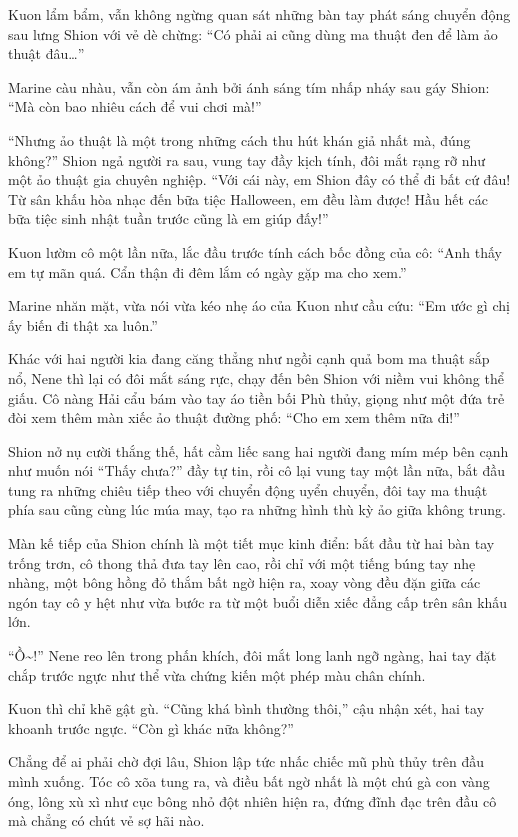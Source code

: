 \documentclass[../main.tex]{subfiles}
\begin{document}
Kuon lẩm bẩm, vẫn không ngừng quan sát những bàn tay phát sáng chuyển động sau lưng Shion với vẻ dè chừng: ``Có phải ai cũng dùng ma thuật đen để làm ảo thuật đâu\dots''

Marine càu nhàu, vẫn còn ám ảnh bởi ánh sáng tím nhấp nháy sau gáy Shion: ``Mà còn bao nhiêu cách để vui chơi mà!''

``Nhưng ảo thuật là một trong những cách thu hút khán giả nhất mà, đúng không?'' Shion ngả người ra sau, vung tay đầy kịch tính, đôi mắt rạng rỡ như một ảo thuật gia chuyên nghiệp. ``Với cái này, em Shion đây có thể đi bất cứ đâu! Từ sân khấu hòa nhạc đến bữa tiệc Halloween, em đều làm được! Hầu hết các bữa tiệc sinh nhật tuần trước cũng là em giúp đấy!''

Kuon lườm cô một lần nữa, lắc đầu trước tính cách bốc đồng của cô: ``Anh thấy em tự mãn quá. Cẩn thận đi đêm lắm có ngày gặp ma cho xem.''

Marine nhăn mặt, vừa nói vừa kéo nhẹ áo của Kuon như cầu cứu: ``Em ước gì chị ấy biến đi thật xa luôn.''

Khác với hai người kia đang căng thẳng như ngồi cạnh quả bom ma thuật sắp nổ, Nene thì lại có đôi mắt sáng rực, chạy đến bên Shion với niềm vui không thể giấu. Cô nàng Hải cẩu bám vào tay áo tiền bối Phù thủy, giọng như một đứa trẻ đòi xem thêm màn xiếc ảo thuật đường phố: ``Cho em xem thêm nữa đi!''

Shion nở nụ cười thắng thế, hất cằm liếc sang hai người đang mím mép bên cạnh như muốn nói ``Thấy chưa?'' đầy tự tin, rồi cô lại vung tay một lần nữa, bắt đầu tung ra những chiêu tiếp theo với chuyển động uyển chuyển, đôi tay ma thuật phía sau cũng cùng lúc múa may, tạo ra những hình thù kỳ ảo giữa không trung.

\ct

Màn kế tiếp của Shion chính là một tiết mục kinh điển: bắt đầu từ hai bàn tay trống trơn, cô thong thả đưa tay lên cao, rồi chỉ với một tiếng búng tay nhẹ nhàng, một bông hồng đỏ thắm bất ngờ hiện ra, xoay vòng đều đặn giữa các ngón tay cô y hệt như vừa bước ra từ một buổi diễn xiếc đẳng cấp trên sân khấu lớn.

``Ồ\~{}!'' Nene reo lên trong phấn khích, đôi mắt long lanh ngỡ ngàng, hai tay đặt chắp trước ngực như thể vừa chứng kiến một phép màu chân chính.

Kuon thì chỉ khẽ gật gù. ``Cũng khá bình thường thôi,'' cậu nhận xét, hai tay khoanh trước ngực. ``Còn gì khác nữa không?''

Chẳng để ai phải chờ đợi lâu, Shion lập tức nhấc chiếc mũ phù thủy trên đầu mình xuống. Tóc cô xõa tung ra, và điều bất ngờ nhất là một chú gà con vàng óng, lông xù xì như cục bông nhỏ đột nhiên hiện ra, đứng đĩnh đạc trên đầu cô mà chẳng có chút vẻ sợ hãi nào.
\end{document}
